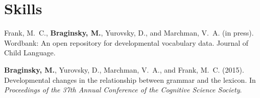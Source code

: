 \documentclass[11pt,letter]{moderncv}
\begin{document}
\section{Skills}

\vspace*{0.25em}


\renewcommand{\refname}{Publications}

\begin{small}
\begin{thebibliography}{}

Frank, M.~C., \textbf{Braginsky, M.}, Yurovsky, D., and Marchman, V.~A. (in press).
\newblock Wordbank: An open repository for developmental vocabulary data. Journal of Child Language.

\textbf{Braginsky, M.}, Yurovsky, D., Marchman, V.~A., and Frank, M.~C. (2015).
\newblock Developmental changes in the relationship between grammar and the
  lexicon.
\newblock In {\em Proceedings of the 37th Annual Conference of the Cognitive
  Science Society}.

\end{thebibliography}
\end{small}

\renewcommand{\refname}{Posters and Talks}
\end{document}
